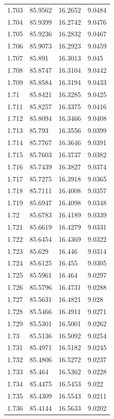 \begin{tabular}{llll}
1.703 & 85.9562 & 16.2652 & 9.0484 \\
1.704 & 85.9399 & 16.2742 & 9.0476 \\
1.705 & 85.9236 & 16.2832 & 9.0467 \\
1.706 & 85.9073 & 16.2923 & 9.0459 \\
1.707 & 85.891 & 16.3013 & 9.045 \\
1.708 & 85.8747 & 16.3104 & 9.0442 \\
1.709 & 85.8584 & 16.3194 & 9.0433 \\
1.71 & 85.8421 & 16.3285 & 9.0425 \\
1.711 & 85.8257 & 16.3375 & 9.0416 \\
1.712 & 85.8094 & 16.3466 & 9.0408 \\
1.713 & 85.793 & 16.3556 & 9.0399 \\
1.714 & 85.7767 & 16.3646 & 9.0391 \\
1.715 & 85.7603 & 16.3737 & 9.0382 \\
1.716 & 85.7439 & 16.3827 & 9.0374 \\
1.717 & 85.7275 & 16.3918 & 9.0365 \\
1.718 & 85.7111 & 16.4008 & 9.0357 \\
1.719 & 85.6947 & 16.4098 & 9.0348 \\
1.72 & 85.6783 & 16.4189 & 9.0339 \\
1.721 & 85.6619 & 16.4279 & 9.0331 \\
1.722 & 85.6454 & 16.4369 & 9.0322 \\
1.723 & 85.629 & 16.446 & 9.0314 \\
1.724 & 85.6125 & 16.455 & 9.0305 \\
1.725 & 85.5961 & 16.464 & 9.0297 \\
1.726 & 85.5796 & 16.4731 & 9.0288 \\
1.727 & 85.5631 & 16.4821 & 9.028 \\
1.728 & 85.5466 & 16.4911 & 9.0271 \\
1.729 & 85.5301 & 16.5001 & 9.0262 \\
1.73 & 85.5136 & 16.5092 & 9.0254 \\
1.731 & 85.4971 & 16.5182 & 9.0245 \\
1.732 & 85.4806 & 16.5272 & 9.0237 \\
1.733 & 85.464 & 16.5362 & 9.0228 \\
1.734 & 85.4475 & 16.5453 & 9.022 \\
1.735 & 85.4309 & 16.5543 & 9.0211 \\
1.736 & 85.4144 & 16.5633 & 9.0202 \\

\end{tabular}
